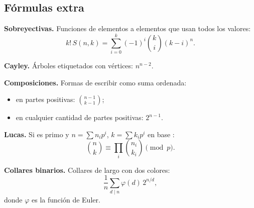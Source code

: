 \subsection{Fórmulas extra}\label{rec:extras}

\textbf{Sobreyectivas.} Funciones de  elementos a 
elementos que usan todos los valores:
\[
k!\,S(n,k)=\sum_{i=0}^{k}(-1)^i\binom{k}{i}(k-i)^n.
\]

\textbf{Cayley.} Árboles etiquetados con  vértices: $n^{n-2}$.

\textbf{Composiciones.} Formas de escribir  como suma ordenada:
\begin{itemize}[leftmargin=1.05em,itemsep=0.5pt,topsep=1pt]
  \item en  partes positivas: $\binom{n-1}{k-1}$;
  \item en cualquier cantidad de partes positivas: $2^{n-1}$.
\end{itemize}

\textbf{Lucas.} Si  es primo y
$n=\sum n_i p^i$, $k=\sum k_i p^i$ en base :
\[
\binom{n}{k}\equiv\prod_i\binom{n_i}{k_i}\pmod p.
\]

\textbf{Collares binarios.} Collares de largo  con dos colores:
\[
\frac{1}{n}\sum_{d\mid n}\varphi(d)\,2^{n/d},
\]
donde $\varphi$ es la función de Euler.
